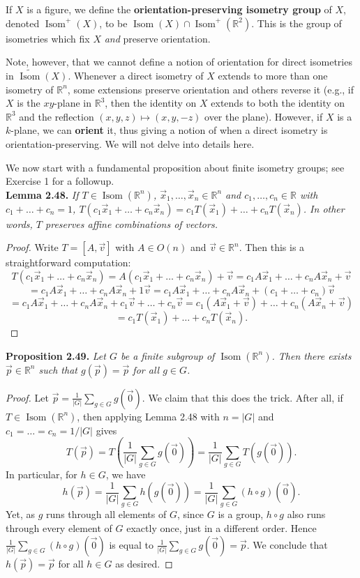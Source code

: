 \documentclass[leqno]{book}
\begin{document}
\noindent If $X$ is a figure, we define the \textbf{orientation-preserving isometry group} of $X$, denoted $\operatorname{Isom}^+(X)$, to be $\operatorname{Isom}(X)\cap\operatorname{Isom}^+(\mathbb R^2)$.  This is the group of isometries which fix $X$ \emph{and} preserve orientation.

Note, however, that we cannot define a notion of orientation for direct isometries in $\widetilde{\operatorname{Isom}}(X)$.  Whenever a direct isometry of $X$ extends to more than one isometry of $\mathbb R^n$, some extensions preserve orientation and others reverse it (e.g., if $X$ is the $xy$-plane in $\mathbb R^3$, then the identity on $X$ extends to both the identity on $\mathbb R^3$ and the reflection $(x,y,z)\mapsto(x,y,-z)$ over the plane).  However, if $X$ is a $k$-plane, we can \textbf{orient} it, thus giving a notion of when a direct isometry is orientation-preserving.  We will not delve into details here.

We now start with a fundamental proposition about finite isometry groups; see Exercise 1 for a followup.\\

\noindent\textbf{Lemma 2.48.} \emph{If $T\in\operatorname{Isom}(\mathbb R^n)$, $\vec x_1,\dots,\vec x_n\in\mathbb R^n$ and $c_1,\dots,c_n\in\mathbb R$ with $c_1+\dots+c_n=1$, $T(c_1\vec x_1+\dots+c_n\vec x_n)=c_1T(\vec x_1)+\dots+c_nT(\vec x_n)$.  In other words, $T$ preserves affine combinations of vectors.}
\begin{proof}
Write $T=[A,\vec v]$ with $A\in O(n)$ and $\vec v\in\mathbb R^n$.  Then this is a straightforward computation:
$$T(c_1\vec x_1+\dots+c_n\vec x_n)=A(c_1\vec x_1+\dots+c_n\vec x_n)+\vec v=c_1A\vec x_1+\dots+c_nA\vec x_n+\vec v$$
$$=c_1A\vec x_1+\dots+c_nA\vec x_n+1\vec v=c_1A\vec x_1+\dots+c_nA\vec x_n+(c_1+\dots+c_n)\vec v$$
$$=c_1A\vec x_1+\dots+c_nA\vec x_n+c_1\vec v+\dots+c_n\vec v=c_1(A\vec x_1+\vec v)+\dots+c_n(A\vec x_n+\vec v)$$
$$=c_1T(\vec x_1)+\dots+c_nT(\vec x_n).$$
\end{proof}
\noindent\textbf{Proposition 2.49.} \emph{Let $G$ be a finite subgroup of $\operatorname{Isom}(\mathbb R^n)$.  Then there exists $\vec p\in\mathbb R^n$ such that $g(\vec p)=\vec p$ for all $g\in G$.}
\begin{proof}
Let $\vec p=\frac 1{|G|}\sum_{g\in G}g(\vec 0)$.  We claim that this does the trick.  After all, if $T\in\operatorname{Isom}(\mathbb R^n)$, then applying Lemma 2.48 with $n=|G|$ and $c_1=\dots=c_n=1/|G|$ gives
$$T(\vec p)=T\left(\frac 1{|G|}\sum_{g\in G}g(\vec 0)\right)=\frac 1{|G|}\sum_{g\in G}T(g(\vec 0)).$$
In particular, for $h\in G$, we have
$$h(\vec p)=\frac 1{|G|}\sum_{g\in G}h(g(\vec 0))=\frac 1{|G|}\sum_{g\in G}(h\circ g)(\vec 0).$$
Yet, as $g$ runs through all elements of $G$, since $G$ is a group, $h\circ g$ also runs through every element of $G$ exactly once, just in a different order.  Hence $\frac 1{|G|}\sum_{g\in G}(h\circ g)(\vec 0)$ is equal to $\frac 1{|G|}\sum_{g\in G}g(\vec 0)=\vec p$.  We conclude that $h(\vec p)=\vec p$ for all $h\in G$ as desired.
\end{proof}
\end{document}
